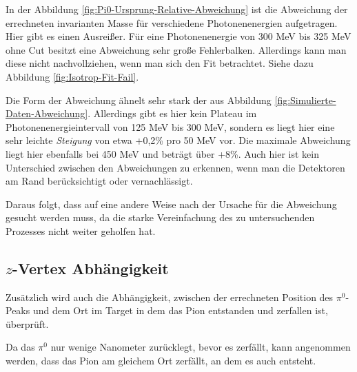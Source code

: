 \documentclass[a4paper,11pt,oneside,final,german,openbib,pdftex]{scrbook}
\begin{document}
{In der Abbildung \ref{fig:Pi0-Ursprung-Relative-Abweichung} ist die Abweichung der errechneten invarianten Masse für verschiedene Photonenenergien aufgetragen.
Hier gibt es einen Ausrei{\ss}er. F\"ur eine Photonenenergie von 300 MeV bis 325 MeV ohne Cut besitzt eine Abweichung sehr gro{\ss}e Fehlerbalken. Allerdings kann man diese nicht nachvollziehen, wenn man sich den Fit betrachtet. Siehe dazu Abbildung \ref{fig:Isotrop-Fit-Fail}.

 Die Form der Abweichung ähnelt sehr stark der aus Abbildung \ref{fig:Simulierte-Daten-Abweichung}.
 Allerdings gibt es hier kein Plateau im Photonenenergieintervall von 125 MeV bis 300 MeV, sondern es liegt hier eine sehr leichte \textit{Steigung} von etwa +0,2\% pro 50 MeV vor. Die maximale Abweichung liegt hier ebenfalls bei 450 MeV und betr\"agt über +8\%. Auch hier ist kein Unterschied zwischen den Abweichungen zu erkennen, wenn man die Detektoren am Rand berücksichtigt oder vernachlässigt. 

Daraus folgt, dass auf eine andere Weise nach der Ursache für die Abweichung gesucht werden muss, da die starke Vereinfachung des zu untersuchenden Prozesses nicht weiter geholfen hat.


\subsection{$z$-Vertex Abh\"angigkeit}
\label{sec:Z-Vertex-Abhaengigkeit}


Zusätzlich wird auch die Abh\"angigkeit, zwischen der errechneten  Position des $\pi^0$-Peaks und dem Ort im Target in dem das Pion entstanden und zerfallen ist, \"uberpr\"uft. 

Da das $\pi^0$ nur wenige Nanometer zur\"ucklegt, bevor es zerf\"allt, kann angenommen werden, dass das Pion am gleichem Ort zerf\"allt, an dem es auch entsteht.


}
\end{document}

